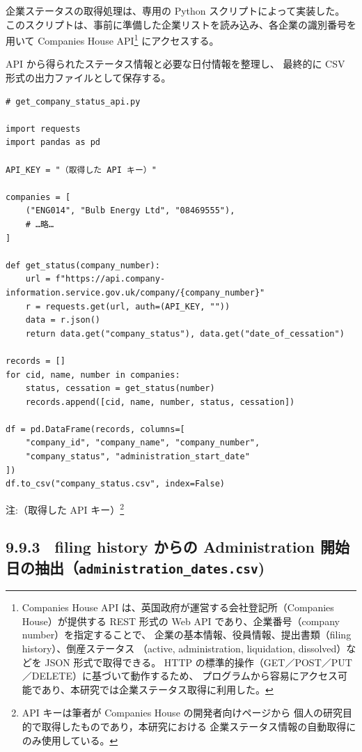 企業ステータスの取得処理は、専用の Python スクリプトによって実装した。
このスクリプトは、事前に準備した企業リストを読み込み、各企業の識別番号を用いて
Companies House API\footnote{
Companies House API は、英国政府が運営する会社登記所（Companies House）が提供する
REST 形式の Web API であり、企業番号（company number）を指定することで、
企業の基本情報、役員情報、提出書類（filing history）、倒産ステータス
（active, administration, liquidation, dissolved）などを JSON 形式で取得できる。
HTTP の標準的操作（GET／POST／PUT／DELETE）に基づいて動作するため、
プログラムから容易にアクセス可能であり、本研究では企業ステータス取得に利用した。
} にアクセスする。

API から得られたステータス情報と必要な日付情報を整理し、
最終的に CSV 形式の出力ファイルとして保存する。


\begin{verbatim}
# get_company_status_api.py

import requests
import pandas as pd

API_KEY = "（取得した API キー）"

companies = [
    ("ENG014", "Bulb Energy Ltd", "08469555"),
    # …略…
]

def get_status(company_number):
    url = f"https://api.company-information.service.gov.uk/company/{company_number}"
    r = requests.get(url, auth=(API_KEY, ""))
    data = r.json()
    return data.get("company_status"), data.get("date_of_cessation")

records = []
for cid, name, number in companies:
    status, cessation = get_status(number)
    records.append([cid, name, number, status, cessation])

df = pd.DataFrame(records, columns=[
    "company_id", "company_name", "company_number",
    "company_status", "administration_start_date"
])
df.to_csv("company_status.csv", index=False)
\end{verbatim}

注:（取得した API キー）\footnote{
API キーは筆者が Companies House の開発者向けページから
個人の研究目的で取得したものであり，本研究における
企業ステータス情報の自動取得にのみ使用している。
}


\subsection*{9.9.3　filing history からの Administration 開始日の抽出（\texttt{administration\_dates.csv})}

